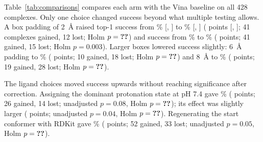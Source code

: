 Table~\ref{tab:comparisons} compares each arm with the Vina baseline on all 428 complexes.
Only one choice changed success beyond what multiple testing allows. A box padding of
\SI{2}{\angstrom} raised top-1 success from \% [, ] to \% [, ]
( points [, ]; 41 complexes gained, 12 lost; Holm $p = \val{comparisons/vina/top1/box_padding_2/p_holm}$) and \pbvalid{}
success from \% to \% ( points; 41 gained, 15 lost; Holm $p = 0.003$). Larger
boxes lowered success slightly: \SI{6}{\angstrom} padding to \% ( points; 10
gained, 18 lost; Holm $p = \val{comparisons/vina/top1/box_padding_6/p_holm}$) and \SI{8}{\angstrom} to \% ( points; 19
gained, 28 lost; Holm $p = \val{comparisons/vina/top1/box_padding_8/p_holm}$).

The ligand choices moved success upwards without reaching significance after correction.
Assigning the dominant protonation state at pH 7.4 gave \% ( points; 26 gained, 14
lost; unadjusted $p = 0.08$, Holm $p = \val{comparisons/vina/top1/ligand_dimorphite/p_holm}$); its \pbvalid{} effect was slightly larger
( points; unadjusted $p = 0.04$, Holm $p = \val{comparisons/vina/pb_valid/ligand_dimorphite/p_holm}$). Regenerating the start conformer with
RDKit gave \% ( points; 52 gained, 33 lost; unadjusted $p = 0.05$, Holm
$p = \val{comparisons/vina/top1/ligand_rdkit_conformer/p_holm}$).

